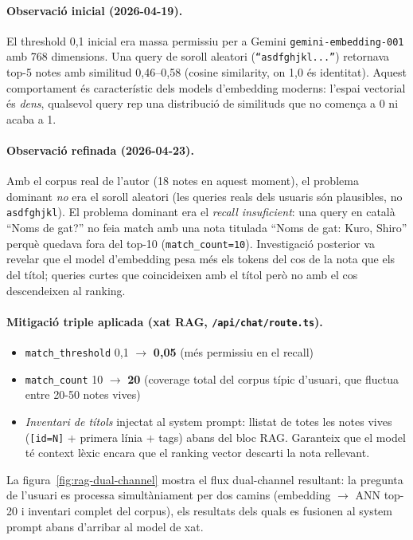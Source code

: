 \paragraph{Observació inicial (2026-04-19).} El threshold 0{,}1 inicial era massa permissiu per a Gemini \texttt{gemini-embedding-001} amb 768 dimensions. Una query de soroll aleatori (\texttt{``asdfghjkl...''}) retornava top-5 notes amb similitud 0{,}46--0{,}58 (cosine similarity, on 1{,}0 és identitat). Aquest comportament és característic dels models d'embedding moderns: l'espai vectorial és \emph{dens}, qualsevol query rep una distribució de similituds que no comença a 0 ni acaba a 1.

\paragraph{Observació refinada (2026-04-23).} Amb el corpus real de l'autor (18 notes en aquest moment), el problema dominant \emph{no} era el soroll aleatori (les queries reals dels usuaris són plausibles, no \texttt{asdfghjkl}). El problema dominant era el \emph{recall insuficient}: una query en català ``Noms de gat?'' no feia match amb una nota titulada ``Noms de gat: Kuro, Shiro'' perquè quedava fora del top-10 (\texttt{match\_count=10}). Investigació posterior va revelar que el model d'embedding pesa més els tokens del cos de la nota que els del títol; queries curtes que coincideixen amb el títol però no amb el cos descendeixen al ranking.

\paragraph{Mitigació triple aplicada (xat RAG, \texttt{/api/chat/route.ts}).}

\begin{itemize}
    \item \texttt{match\_threshold} 0{,}1 $\rightarrow$ \textbf{0{,}05} (més permissiu en el recall)
    \item \texttt{match\_count} 10 $\rightarrow$ \textbf{20} (coverage total del corpus típic d'usuari, que fluctua entre 20-50 notes vives)
    \item \emph{Inventari de títols} injectat al system prompt: llistat de totes les notes vives (\texttt{[id=N]} + primera línia + tags) abans del bloc RAG. Garanteix que el model té context lèxic encara que el ranking vector descarti la nota rellevant.
\end{itemize}

La figura~\ref{fig:rag-dual-channel} mostra el flux dual-channel resultant: la pregunta de l'usuari es processa simultàniament per dos camins (embedding $\rightarrow$ ANN top-20 i inventari complet del corpus), els resultats dels quals es fusionen al system prompt abans d'arribar al model de xat.

